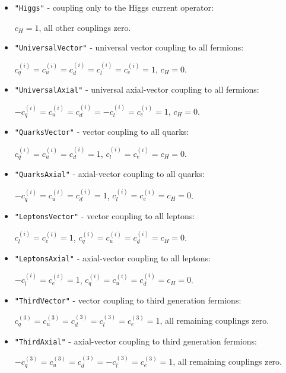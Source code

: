 \documentclass[notitlepage,12pt]{article}
\begin{document}
\begin{itemize}

\item \texttt{"Higgs"} - coupling only to the Higgs current operator: 

\qquad $c_H = 1$, all other couplings zero.

\item \texttt{"UniversalVector"} - universal vector coupling to all fermions: 

\qquad $c_q^{(i)} = c_u^{(i)} = c_d^{(i)} = c_l^{(i)} = c_e^{(i)} = 1$, $c_H = 0$.

\item \texttt{"UniversalAxial"} - universal axial-vector coupling to all fermions: 

\qquad $-c_q^{(i)} = c_u^{(i)} = c_d^{(i)} = -c_l^{(i)} = c_e^{(i)} = 1$, $c_H = 0$.

\item \texttt{"QuarksVector"} - vector coupling to all quarks: 

\qquad $c_q^{(i)} = c_u^{(i)} = c_d^{(i)} = 1$, $c_l^{(i)} = c_e^{(i)} = c_H = 0$.

\item \texttt{"QuarksAxial"} - axial-vector coupling to all quarks: 

\qquad $-c_q^{(i)} = c_u^{(i)} = c_d^{(i)} = 1$, $c_l^{(i)} = c_e^{(i)} = c_H = 0$.

\item \texttt{"LeptonsVector"} - vector coupling to all leptons: 

\qquad $c_l^{(i)} = c_e^{(i)} = 1$, $c_q^{(i)} = c_u^{(i)} = c_d^{(i)} = c_H = 0$.

\item \texttt{"LeptonsAxial"} - axial-vector coupling to all leptons: 

\qquad $-c_l^{(i)} = c_e^{(i)} = 1$, $c_q^{(i)} = c_u^{(i)} = c_d^{(i)} = c_H = 0$.

\item \texttt{"ThirdVector"} - vector coupling to third generation fermions: 

\qquad $c_q^{(3)} = c_u^{(3)} = c_d^{(3)} = c_l^{(3)} = c_e^{(3)} = 1$, all remaining couplings zero.

\item \texttt{"ThirdAxial"} - axial-vector coupling to third generation fermions: 

\qquad $-c_q^{(3)} = c_u^{(3)} = c_d^{(3)} = -c_l^{(3)} = c_e^{(3)} = 1$, all remaining couplings zero.

\end{itemize}
\end{document}
